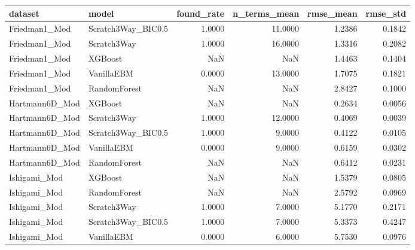 \begin{tabular}{llrrrr}
\toprule
dataset & model & found_rate & n_terms_mean & rmse_mean & rmse_std \\
\midrule
Friedman1_Mod & Scratch3Way_BIC0.5 & 1.0000 & 11.0000 & 1.2386 & 0.1842 \\
Friedman1_Mod & Scratch3Way & 1.0000 & 16.0000 & 1.3316 & 0.2082 \\
Friedman1_Mod & XGBoost & NaN & NaN & 1.4463 & 0.1404 \\
Friedman1_Mod & VanillaEBM & 0.0000 & 13.0000 & 1.7075 & 0.1821 \\
Friedman1_Mod & RandomForest & NaN & NaN & 2.8427 & 0.1000 \\
Hartmann6D_Mod & XGBoost & NaN & NaN & 0.2634 & 0.0056 \\
Hartmann6D_Mod & Scratch3Way & 1.0000 & 12.0000 & 0.4069 & 0.0039 \\
Hartmann6D_Mod & Scratch3Way_BIC0.5 & 1.0000 & 9.0000 & 0.4122 & 0.0105 \\
Hartmann6D_Mod & VanillaEBM & 0.0000 & 9.0000 & 0.6159 & 0.0302 \\
Hartmann6D_Mod & RandomForest & NaN & NaN & 0.6412 & 0.0231 \\
Ishigami_Mod & XGBoost & NaN & NaN & 1.5379 & 0.0805 \\
Ishigami_Mod & RandomForest & NaN & NaN & 2.5792 & 0.0969 \\
Ishigami_Mod & Scratch3Way & 1.0000 & 7.0000 & 5.1770 & 0.2171 \\
Ishigami_Mod & Scratch3Way_BIC0.5 & 1.0000 & 7.0000 & 5.3373 & 0.4247 \\
Ishigami_Mod & VanillaEBM & 0.0000 & 6.0000 & 5.7530 & 0.0976 \\
\bottomrule
\end{tabular}
